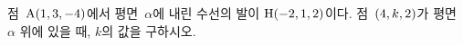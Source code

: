 점~$\mathrm{A}(1{,}\mkern3mu\mathopen{}3{,}\mkern3mu\mathopen{}-4)$에서 평면~$\alpha$에 내린 수선의 발이 $\mathrm{H}(-2{,}\mkern3mu\mathopen{}1{,}\mkern3mu\mathopen{}2)$이다. 점~$(4{,}\mkern3mu\mathopen{}k{,}\mkern3mu\mathopen{}2)$가 평면~$\alpha$ 위에 있을 때, $k$의 값을 구하시오.
